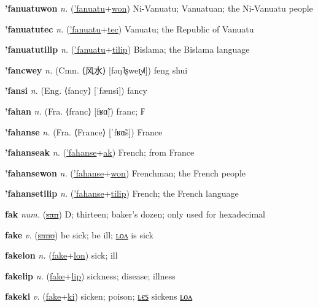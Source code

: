 \textbf{\hypertarget{'fanuatuwon}{'fanuatuwon}} \textit{n.} (\hyperlink{'fanuatu}{'fanuatu}+\allowbreak \hyperlink{won}{won})
Ni-Vanuatu; Vanuatuan; the Ni-Vanuatu people

\textbf{\hypertarget{'fanuatutec}{'fanuatutec}} \textit{n.} (\hyperlink{'fanuatu}{'fanuatu}+\allowbreak \hyperlink{tec}{tec})
Vanuatu; the Republic of Vanuatu

\textbf{\hypertarget{'fanuatutilip}{'fanuatutilip}} \textit{n.} (\hyperlink{'fanuatu}{'fanuatu}+\allowbreak \hyperlink{tilip}{tilip})
Bislama; the Bislama language

\textbf{\hypertarget{'fancwey}{'fancwey}} \textit{n.} (Cmn. ⟨{\chinese{}风水}⟩ [fəŋ˥ʂweɪ̯˧˩˥])
feng shui

\textbf{\hypertarget{'fansi}{'fansi}} \textit{n.} (Eng. ⟨fancy⟩ [ˈfænsi])
fancy

\textbf{\hypertarget{'fahan}{'fahan}} \textit{n.} (Fra. ⟨franc⟩ [fʁɑ̃])
franc; ₣

\textbf{\hypertarget{'fahanse}{'fahanse}} \textit{n.} (Fra. ⟨France⟩ [ˈfʁɑ̃s])
France

\textbf{\hypertarget{'fahanseak}{'fahanseak}} \textit{n.} (\hyperlink{'fahanse}{'fahanse}+\allowbreak \hyperlink{ak}{ak})
French; from France

\textbf{\hypertarget{'fahansewon}{'fahansewon}} \textit{n.} (\hyperlink{'fahanse}{'fahanse}+\allowbreak \hyperlink{won}{won})
Frenchman; the French people

\textbf{\hypertarget{'fahansetilip}{'fahansetilip}} \textit{n.} (\hyperlink{'fahanse}{'fahanse}+\allowbreak \hyperlink{tilip}{tilip})
French; the French language

\textbf{\hypertarget{fak}{fak}} \textit{num.} (\hyperlink{san}{\sout{san}})
D; thirteen; baker’s dozen; only used for hexadecimal

\textbf{\hypertarget{fake}{fake}} \textit{v.} (\hyperlink{sano}{\sout{sano}})
be sick; be ill; \hyperlink{fakelon}{ʟᴏᴧ} is sick

\textbf{\hypertarget{fakelon}{fakelon}} \textit{n.} (\hyperlink{fake}{fake}+\allowbreak \hyperlink{lon}{lon})
sick; ill

\textbf{\hypertarget{fakelip}{fakelip}} \textit{n.} (\hyperlink{fake}{fake}+\allowbreak \hyperlink{lip}{lip})
sickness; disease; illness

\textbf{\hypertarget{fakeki}{fakeki}} \textit{v.} (\hyperlink{fake}{fake}+\allowbreak \hyperlink{ki}{ki})
sicken; poison; \hyperlink{fakekiles}{ʟєꜱ} sickens \hyperlink{fakekilon}{ʟᴏᴧ}

